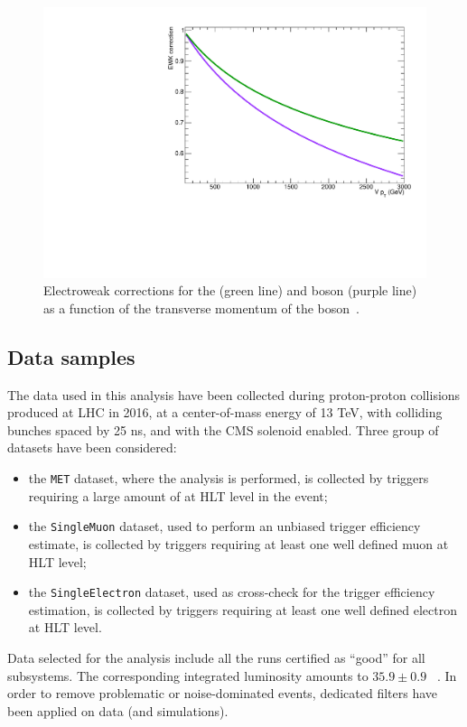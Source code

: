 \begin{figure}[!htb]
 \centering
   \includegraphics[width=.495\textwidth]{figures/EWK.pdf}
 \caption{Electroweak corrections for the \Z (green line) and \W boson (purple line) as a function of the transverse momentum of the boson~\cite{Kallweit:2015fta}.}
 \label{fig:ewk}
\end{figure}



\subsection{Data samples}
\label{sec:data}

The data used in this analysis have been collected during proton-proton collisions produced at LHC in 2016, at a center-of-mass energy of 13 TeV, with colliding bunches spaced by 25 ns, and with the CMS solenoid enabled. Three group of datasets have been considered:
\begin{itemize}
\item the {\tt MET} dataset, where the analysis is performed, is collected by triggers requiring a large amount of \met at HLT level in the event;
\item the {\tt SingleMuon} dataset, used to perform an unbiased trigger efficiency estimate, is collected by triggers requiring at least one well defined muon at HLT level;
\item the {\tt SingleElectron} dataset, used as cross-check for the trigger efficiency estimation, is collected by triggers requiring at least one well defined electron at HLT level.
\end{itemize}

\noindent Data selected for the analysis include all the runs certified as ``good'' for all subsystems. The corresponding integrated luminosity amounts to $35.9 \pm 0.9$ \fbinv~\cite{CMS:2017sdi}. In order to remove problematic or noise-dominated events, dedicated \MET filters have been applied on data (and simulations).

